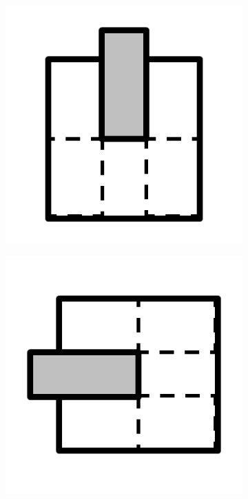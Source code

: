 \documentclass{article}
\begin{document}
\begin{figure}[!h]
\begin{subfigure}{.25\textwidth}
    \caption{}
    \label{fig:c4}
  \end{subfigure}\\
  \begin{subfigure}{.25\textwidth}
    \centering
    \includegraphics[width=.95\linewidth]{16cases/c5.png}
    \caption{}
    \label{fig:c5}
  \end{subfigure}%
  \begin{subfigure}{.25\textwidth}
    \centering
    \includegraphics[width=.95\linewidth]{16cases/c6.png}

\end{subfigure}
\end{figure}
\end{document}
